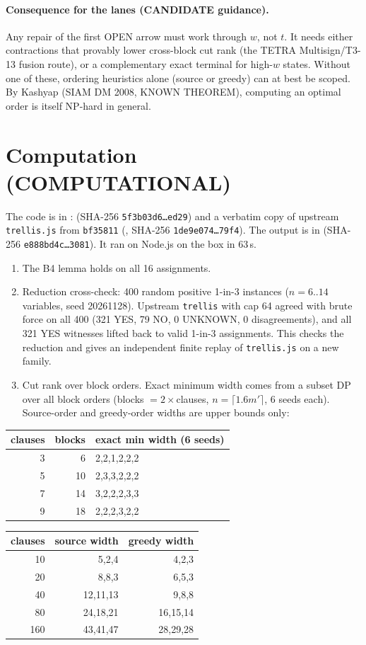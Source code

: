 \documentclass[11pt]{article}
\theoremstyle{definition}
\begin{document}
\paragraph{Consequence for the lanes (CANDIDATE guidance).}
Any repair of the first OPEN arrow must work through $w$, not $t$. It needs either contractions that provably lower cross-block cut rank (the TETRA Multisign/T3-13 fusion route), or a complementary exact terminal for high-$w$ states. Without one of these, ordering heuristics alone (source or greedy) can at best be scoped. By Kashyap (SIAM DM 2008, KNOWN THEOREM), computing an optimal order is itself NP-hard in general.

\section{Computation (COMPUTATIONAL)}
The code is in :
 (SHA-256 \texttt{5f3b03d6\ldots ed29}) and a verbatim copy of upstream
\texttt{trellis.js} from \texttt{bf35811} (, SHA-256 \texttt{1de9e074\ldots 79f4}).
The output is in  (SHA-256 \texttt{e888bd4c\ldots 3081}). It ran on Node.js on the box in 63\,s.
\begin{enumerate}
\item The B4 lemma holds on all 16 assignments.
\item Reduction cross-check: 400 random positive 1-in-3 instances ($n=6..14$ variables, seed 20261128). Upstream \texttt{trellis} with cap 64 agreed with brute force on all 400 (321 YES, 79 NO, 0 UNKNOWN, 0 disagreements), and all 321 YES witnesses lifted back to valid 1-in-3 assignments. This checks the reduction and gives an independent finite replay of \texttt{trellis.js} on a new family.
\item Cut rank over block orders. Exact minimum width comes from a subset DP over all block orders (blocks $=2\times$clauses, $n=\lceil 1.6m'\rceil$, 6 seeds each). Source-order and greedy-order widths are upper bounds only:
\end{enumerate}
\begin{center}
\begin{tabular}{rrl}
\toprule
clauses & blocks & exact min width (6 seeds)\\\midrule
3&6&2,2,1,2,2,2\\ 5&10&2,3,3,2,2,2\\ 7&14&3,2,2,2,3,3\\ 9&18&2,2,2,3,2,2\\\bottomrule
\end{tabular}\qquad
\begin{tabular}{rrr}
\toprule
clauses & source width & greedy width\\\midrule
10&5,2,4&4,2,3\\ 20&8,8,3&6,5,3\\ 40&12,11,13&9,8,8\\ 80&24,18,21&16,15,14\\ 160&43,41,47&28,29,28\\\bottomrule
\end{tabular}
\end{center}
\end{document}
